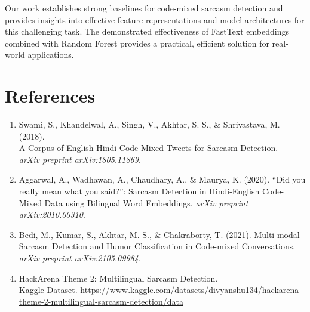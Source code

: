 \documentclass[11pt]{article}
\begin{document}
Our work establishes strong baselines for code-mixed sarcasm detection and provides insights into effective feature representations and model architectures for this challenging task. The demonstrated effectiveness of FastText embeddings combined with Random Forest provides a practical, efficient solution for real-world applications.

\section*{References}

\begin{enumerate}
\item Swami, S., Khandelwal, A., Singh, V., Akhtar, S. S., \& Shrivastava, M. (2018).\\ A Corpus of English-Hindi Code-Mixed Tweets for Sarcasm Detection.\\ \textit{arXiv preprint arXiv:1805.11869}.

\item Aggarwal, A., Wadhawan, A., Chaudhary, A., \& Maurya, K. (2020). ``Did you really mean what you said?'': Sarcasm Detection in Hindi-English Code-Mixed Data using Bilingual Word Embeddings. \textit{arXiv preprint arXiv:2010.00310}.

\item Bedi, M., Kumar, S., Akhtar, M. S., \& Chakraborty, T. (2021). Multi-modal Sarcasm Detection and Humor Classification in Code-mixed Conversations. \textit{arXiv preprint arXiv:2105.09984}.

\item HackArena Theme 2: Multilingual Sarcasm Detection.\\ Kaggle Dataset. \url{https://www.kaggle.com/datasets/divyanshu134/hackarena-theme-2-multilingual-sarcasm-detection/data}
\end{enumerate}
\end{document}
